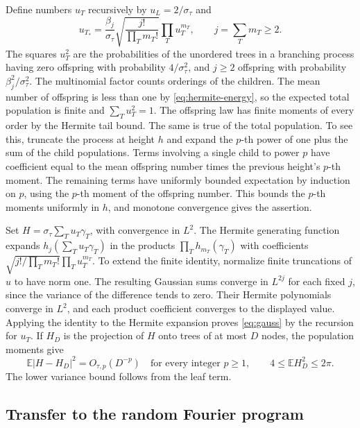 \documentclass[preprints,article,submit,oneauthor]{Definitions/mdpi}
\newcommand{\E}{\mathbb E}
\newcommand{\abs}[1]{\lvert #1\rvert}
\begin{document}
Define numbers \(u_T\) recursively by \(u_L=2/\sigma_\tau\) and
\[
 u_{T_*}=\frac{\beta_j}{\sigma_\tau}
      \sqrt{\frac{j!}{\prod_T m_T!}}\prod_T u_T^{m_T},
 \qquad j=\sum_T m_T\ge2.
\]
The squares \(u_T^2\) are the probabilities of the unordered trees
in a branching process having zero offspring with probability
\(4/\sigma_\tau^2\), and \(j\ge2\) offspring with probability \(\beta_j^2/\sigma_\tau^2\).
The multinomial factor counts orderings of the children. The mean
number of offspring is less than one by \eqref{eq:hermite-energy},
so the expected total population is finite and \(\sum_Tu_T^2=1\).
The offspring law has finite moments of every order by the Hermite
tail bound. The same is true of the total population. To see this,
truncate the process at height \(h\) and expand the \(p\)-th power of
one plus the sum of the child populations. Terms involving a single
child to power \(p\) have coefficient equal to the mean offspring
number times the previous height's \(p\)-th moment. The remaining
terms have uniformly bounded expectation by induction on \(p\),
using the \(p\)-th moment of the offspring number. This bounds the
\(p\)-th moments uniformly in \(h\), and monotone convergence gives
the assertion.

Set \(H=\sigma_\tau\sum_Tu_T\gamma_T\), with convergence in \(L^2\).
The Hermite generating function expands \(h_j(\sum_Tu_T\gamma_T)\)
in the products \(\prod_T h_{m_T}(\gamma_T)\) with coefficients
\(\sqrt{j!/\prod_Tm_T!}\prod_Tu_T^{m_T}\). To extend the finite identity,
normalize finite truncations of \(u\) to have norm one. The resulting
Gaussian sums converge in \(L^{2j}\) for each fixed \(j\), since the
variance of the difference tends to zero. Their Hermite polynomials
converge in \(L^2\), and each product coefficient converges to the
displayed value. Applying the identity to the Hermite expansion proves
\eqref{eq:gauss} by the recursion for \(u_T\). If \(H_D\) is the projection
of \(H\) onto trees of at most \(D\) nodes, the population moments give
\begin{equation}\label{eq:tree-tail}
 \E\abs{H-H_D}^2=O_{\tau,p}(D^{-p})\quad\text{for every integer }p\ge1,
 \qquad 4\le\E H_D^2\le2\pi.
\end{equation}
The lower variance bound follows from the leaf term.

\subsection{Transfer to the random Fourier program}
\end{document}
